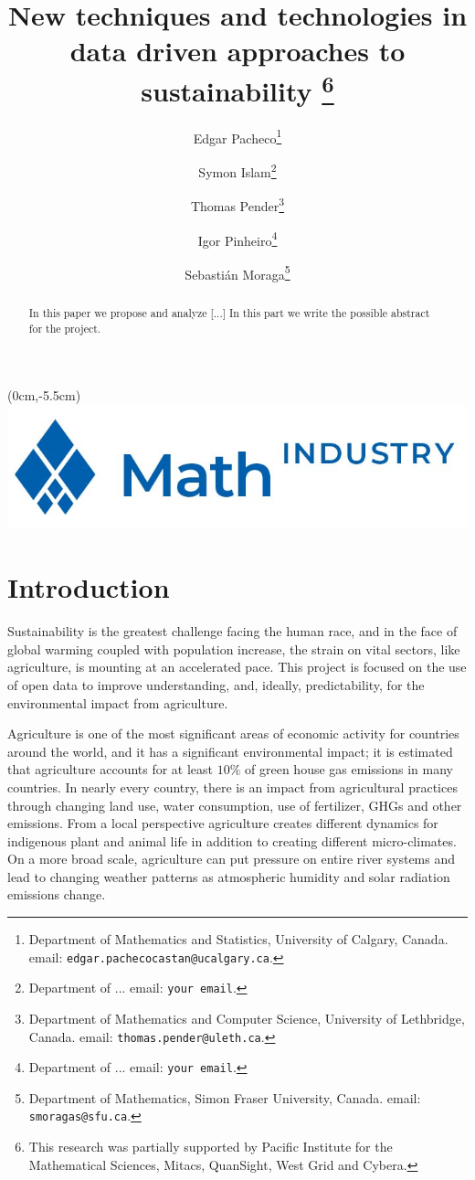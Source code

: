 \documentclass[11pt]{article}
\title{New techniques and technologies in data driven approaches to sustainability
\thanks{This research was 
partially supported by  Pacific Institute for the Mathematical Sciences, Mitacs, QuanSight, West Grid and Cybera.}}
\author{{\sc Edgar Pacheco}\thanks{Department of Mathematics and Statistics, University of Calgary, Canada.
email: {\tt edgar.pachecocastan@ucalgary.ca}.}
\and
{\sc Symon Islam}\thanks{Department of ...
email: {\tt your email}.}
\and
{\sc Thomas Pender}\thanks{Department of Mathematics and Computer Science, University of Lethbridge, Canada.
email: {\tt thomas.pender@uleth.ca}.}
\and
{\sc Igor Pinheiro}\thanks{Department of ...
email: {\tt your email}.}
\and
{\sc Sebasti\'an Moraga}\thanks{ Department of Mathematics, Simon Fraser University, Canada.
email: {\tt smoragas@sfu.ca}.}}
\date{}
\numberwithin{equation}{section}
\begin{document}
\maketitle
\begin{textblock*}{2cm}(0cm,-5.5cm)
  \includegraphics[scale=0.1]{m2pilogo}%
\end{textblock*}

\begin{abstract}
\noindent
In this paper we propose and analyze [...] In this part we write the possible abstract for the project.

\end{abstract}

\smallskip\noindent

                                                  

\section{Introduction}\label{introduction}

Sustainability is the greatest challenge facing the human race, and in the face of global warming coupled with population increase, the strain on vital sectors, like agriculture, is mounting at an accelerated pace. This project is focused on the use of open data to improve understanding, and, ideally, predictability, for the environmental impact from agriculture. 

Agriculture is one of the most significant areas of economic activity for countries around the world, and it has a significant environmental impact; it is estimated that agriculture accounts for at least $10\%$ of green house gas emissions in many countries. In nearly every country, there is an impact from agricultural practices through changing land use, water consumption, use of fertilizer, GHGs and other emissions. From a local perspective agriculture creates different dynamics for indigenous plant and animal life in addition to creating different micro-climates. On a more broad scale, agriculture can put pressure on entire river systems and lead to changing weather patterns as atmospheric humidity and solar radiation emissions change.
\end{document}
